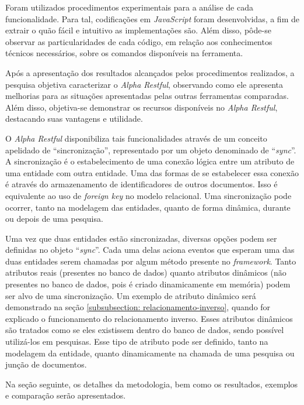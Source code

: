 Foram utilizados procedimentos experimentais para a análise de cada funcionalidade. Para tal, codificações em \textit{JavaScript} foram desenvolvidas, a fim de extrair o quão fácil e intuitivo as implementações são. Além disso, pôde-se observar as particularidades de cada código, em relação aos conhecimentos técnicos necessários, sobre os comandos disponíveis na ferramenta.

Após a apresentação dos resultados alcançados pelos procedimentos realizados, a pesquisa objetiva caracterizar o \textit{Alpha Restful}, observando como ele apresenta melhorias para as situações apresentadas pelas outras ferramentas comparadas. Além disso, objetiva-se demonstrar os recursos disponíveis no \textit{Alpha Restful}, destacando suas vantagens e utilidade.

O \textit{Alpha Restful} disponibiliza tais funcionalidades através de um conceito apelidado de ``sincronização'', representado por um objeto denominado de ``\textit{sync}''. A sincronização é o estabelecimento de uma conexão lógica entre um atributo de uma entidade com outra entidade. Uma das formas de se estabelecer essa conexão é através do armazenamento de identificadores de outros documentos. Isso é equivalente ao uso de \textit{foreign key} no modelo relacional. Uma sincronização pode ocorrer, tanto na modelagem das entidades, quanto de forma dinâmica, durante ou depois de uma pesquisa.

Uma vez que duas entidades estão sincronizadas, diversas opções podem ser definidas no objeto ``\textit{sync}''. Cada uma delas aciona eventos que esperam uma das duas entidades serem chamadas por algum método presente no \textit{framework}. Tanto atributos reais (presentes no banco de dados) quanto atributos dinâmicos (não presentes no banco de dados, pois é criado dinamicamente em memória) podem ser alvo de uma sincronização. Um exemplo de atributo dinâmico será demonstrado na seção \ref{subsubsection: relacionamento-inverso}, quando for explicado o funcionamento do relacionamento inverso. Esses atributos dinâmicos são tratados como se eles existissem dentro do banco de dados, sendo possível utilizá-los em pesquisas. Esse tipo de atributo pode ser definido, tanto na modelagem da entidade, quanto dinamicamente na chamada de uma pesquisa ou junção de documentos.

Na seção seguinte, os detalhes da metodologia, bem como os resultados, exemplos e comparação serão apresentados.


